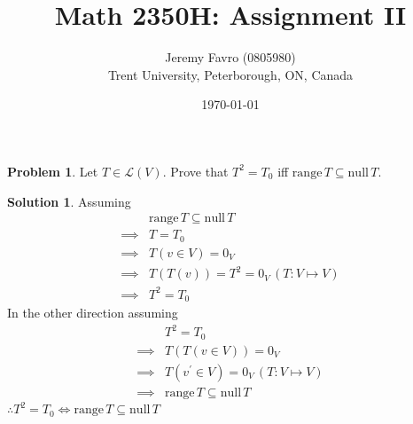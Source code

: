 \documentclass[10pt]{article}
\title{Math 2350H: Assignment II}
\author{Jeremy Favro (0805980) \\ Trent University, Peterborough, ON, Canada}
\date{\today}
\theoremstyle{definition}
\newtheorem{problem}{Problem}
\newtheorem{soln}{Solution}
\begin{document}
\maketitle

\begin{problem}
Let $T\in\mathcal{L}(V)$. Prove that $T^2=T_0$ iff $\mathrm{range}\,T\subseteq\mathrm{null}\,T$.
\end{problem}
\begin{soln}
  Assuming
  \begin{align*}
             & \mathrm{range}\,T\subseteq\mathrm{null}\,T \\
    \implies & T=T_0                                      \\
    \implies & T(v\in V)=0_V                              \\
    \implies & T(T(v))=T^2=0_V\, (T:V\mapsto V)           \\
    \implies & T^2=T_0
  \end{align*}
  In the other direction assuming
  \begin{align*}
             & T^2=T_0                                    \\
    \implies & T(T(v\in V))=0_V                           \\
    \implies & T(v^\prime \in V)=0_V \, (T:V\mapsto V)    \\
    \implies & \mathrm{range}\,T\subseteq\mathrm{null}\,T
  \end{align*}
  $\therefore T^2=T_0\iff \mathrm{range}\,T\subseteq\mathrm{null}\,T$
\end{soln}
\newpage
\end{document}
